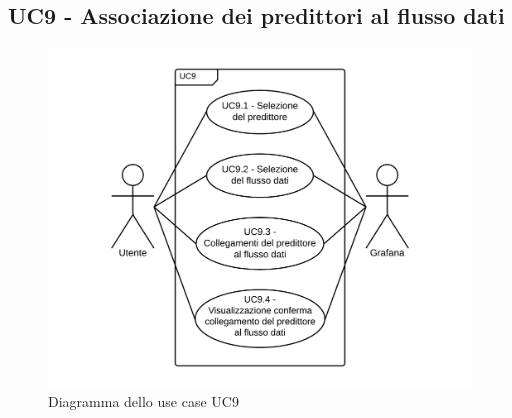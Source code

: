 \subsection{UC9 - Associazione dei predittori al flusso dati}
\begin{figure}[H]
\includegraphics{img/UC9_-_Associazione_dei_predittori_al_flusso_dati.png}
\caption{Diagramma dello use case UC9}
\end{figure}
